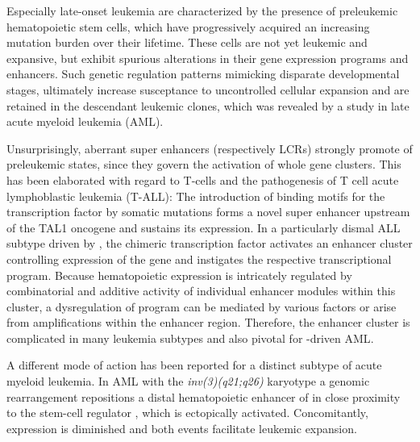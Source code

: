 Especially late-onset leukemia are characterized by the presence of preleukemic hematopoietic stem cells, which have progressively acquired an increasing mutation burden over their lifetime. These cells are not yet leukemic and expansive, but exhibit spurious alterations in their gene expression programs and enhancers. Such genetic regulation patterns mimicking disparate developmental stages, ultimately increase susceptance to uncontrolled cellular expansion and are retained in the descendant leukemic clones, which was revealed by a study in late acute myeloid leukemia (AML)\cite{Corces2016}. 

Unsurprisingly, aberrant super enhancers (respectively LCRs) strongly promote of preleukemic states, since they govern the activation of whole gene clusters. This has been elaborated with regard to T-cells and the pathogenesis of T cell acute lymphoblastic leukemia (T-ALL): The introduction of binding motifs for the  transcription factor by somatic mutations forms a novel super enhancer upstream of the TAL1 oncogene and sustains its expression\cite{Mansour2014,Vahedi2015}. In a particularly dismal ALL subtype driven by , the chimeric transcription factor activates an enhancer cluster controlling expression of the  gene and instigates the respective transcriptional program\cite{Huang2019}. Because hematopoietic  expression is intricately regulated by combinatorial and additive activity of individual enhancer modules within this cluster\cite{Bahr2018}, a dysregulation of  program can be mediated by various factors or arise from amplifications within the enhancer region\cite{Shi2013}. Therefore, the enhancer cluster is complicated in many leukemia subtypes and also pivotal for \mllafnine-driven AML\cite{Bahr2018}. 

A different mode of action has been reported for a distinct subtype of acute myeloid leukemia. In AML with the \emph{inv(3)(q21;q26)} karyotype\cite{Arber2016} a genomic rearrangement repositions a distal hematopoietic enhancer of  in close proximity to the stem-cell regulator , which is ectopically activated. Concomitantly,  expression is diminished and both events facilitate leukemic expansion\cite{Yamazaki2014,Groeschel2014}. 




